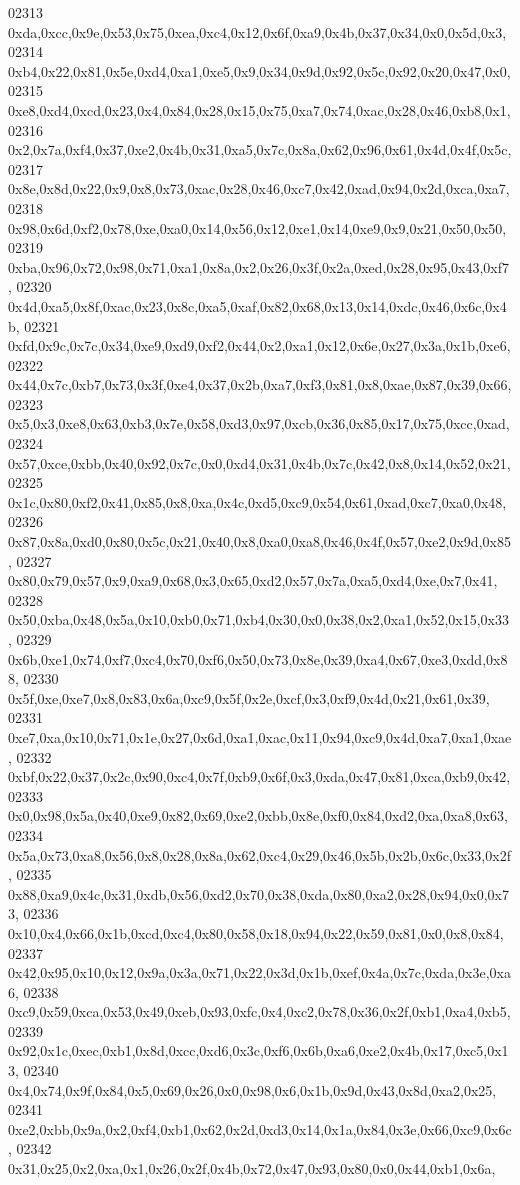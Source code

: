\begin{DoxyCode}
02313   0xda,0xcc,0x9e,0x53,0x75,0xea,0xc4,0x12,0x6f,0xa9,0x4b,0x37,0x34,0x0,0x5d,0x3,
02314   0xb4,0x22,0x81,0x5e,0xd4,0xa1,0xe5,0x9,0x34,0x9d,0x92,0x5c,0x92,0x20,0x47,0x0,
02315   0xe8,0xd4,0xcd,0x23,0x4,0x84,0x28,0x15,0x75,0xa7,0x74,0xac,0x28,0x46,0xb8,0x1,
02316   0x2,0x7a,0xf4,0x37,0xe2,0x4b,0x31,0xa5,0x7c,0x8a,0x62,0x96,0x61,0x4d,0x4f,0x5c,
02317   0x8e,0x8d,0x22,0x9,0x8,0x73,0xac,0x28,0x46,0xc7,0x42,0xad,0x94,0x2d,0xca,0xa7,
02318   0x98,0x6d,0xf2,0x78,0xe,0xa0,0x14,0x56,0x12,0xe1,0x14,0xe9,0x9,0x21,0x50,0x50,
02319   0xba,0x96,0x72,0x98,0x71,0xa1,0x8a,0x2,0x26,0x3f,0x2a,0xed,0x28,0x95,0x43,0xf7,
02320   0x4d,0xa5,0x8f,0xac,0x23,0x8c,0xa5,0xaf,0x82,0x68,0x13,0x14,0xdc,0x46,0x6c,0x4b,
02321   0xfd,0x9c,0x7c,0x34,0xe9,0xd9,0xf2,0x44,0x2,0xa1,0x12,0x6e,0x27,0x3a,0x1b,0xe6,
02322   0x44,0x7c,0xb7,0x73,0x3f,0xe4,0x37,0x2b,0xa7,0xf3,0x81,0x8,0xae,0x87,0x39,0x66,
02323   0x5,0x3,0xe8,0x63,0xb3,0x7e,0x58,0xd3,0x97,0xcb,0x36,0x85,0x17,0x75,0xcc,0xad,
02324   0x57,0xce,0xbb,0x40,0x92,0x7c,0x0,0xd4,0x31,0x4b,0x7c,0x42,0x8,0x14,0x52,0x21,
02325   0x1c,0x80,0xf2,0x41,0x85,0x8,0xa,0x4c,0xd5,0xc9,0x54,0x61,0xad,0xc7,0xa0,0x48,
02326   0x87,0x8a,0xd0,0x80,0x5c,0x21,0x40,0x8,0xa0,0xa8,0x46,0x4f,0x57,0xe2,0x9d,0x85,
02327   0x80,0x79,0x57,0x9,0xa9,0x68,0x3,0x65,0xd2,0x57,0x7a,0xa5,0xd4,0xe,0x7,0x41,
02328   0x50,0xba,0x48,0x5a,0x10,0xb0,0x71,0xb4,0x30,0x0,0x38,0x2,0xa1,0x52,0x15,0x33,
02329   0x6b,0xe1,0x74,0xf7,0xc4,0x70,0xf6,0x50,0x73,0x8e,0x39,0xa4,0x67,0xe3,0xdd,0x88,
02330   0x5f,0xe,0xe7,0x8,0x83,0x6a,0xc9,0x5f,0x2e,0xcf,0x3,0xf9,0x4d,0x21,0x61,0x39,
02331   0xe7,0xa,0x10,0x71,0x1e,0x27,0x6d,0xa1,0xac,0x11,0x94,0xc9,0x4d,0xa7,0xa1,0xae,
02332   0xbf,0x22,0x37,0x2c,0x90,0xc4,0x7f,0xb9,0x6f,0x3,0xda,0x47,0x81,0xca,0xb9,0x42,
02333   0x0,0x98,0x5a,0x40,0xe9,0x82,0x69,0xe2,0xbb,0x8e,0xf0,0x84,0xd2,0xa,0xa8,0x63,
02334   0x5a,0x73,0xa8,0x56,0x8,0x28,0x8a,0x62,0xc4,0x29,0x46,0x5b,0x2b,0x6c,0x33,0x2f,
02335   0x88,0xa9,0x4c,0x31,0xdb,0x56,0xd2,0x70,0x38,0xda,0x80,0xa2,0x28,0x94,0x0,0x73,
02336   0x10,0x4,0x66,0x1b,0xcd,0xc4,0x80,0x58,0x18,0x94,0x22,0x59,0x81,0x0,0x8,0x84,
02337   0x42,0x95,0x10,0x12,0x9a,0x3a,0x71,0x22,0x3d,0x1b,0xef,0x4a,0x7c,0xda,0x3e,0xa6,
02338   0xc9,0x59,0xca,0x53,0x49,0xeb,0x93,0xfc,0x4,0xc2,0x78,0x36,0x2f,0xb1,0xa4,0xb5,
02339   0x92,0x1c,0xec,0xb1,0x8d,0xcc,0xd6,0x3c,0xf6,0x6b,0xa6,0xe2,0x4b,0x17,0xc5,0x13,
02340   0x4,0x74,0x9f,0x84,0x5,0x69,0x26,0x0,0x98,0x6,0x1b,0x9d,0x43,0x8d,0xa2,0x25,
02341   0xe2,0xbb,0x9a,0x2,0xf4,0xb1,0x62,0x2d,0xd3,0x14,0x1a,0x84,0x3e,0x66,0xc9,0x6c,
02342   0x31,0x25,0x2,0xa,0x1,0x26,0x2f,0x4b,0x72,0x47,0x93,0x80,0x0,0x44,0xb1,0x6a,

\end{DoxyCode}
